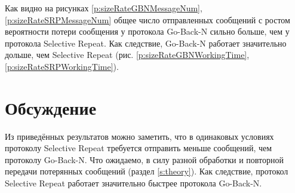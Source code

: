 \documentclass[a4paper,12pt]{article}
\begin{document}
    Как видно на рисунках \ref{p:sizeRateGBNMessageNum}, \ref{p:sizeRateSRPMessageNum} общее число отправленных сообщений с ростом вероятности потери сообщения
    у протокола Go-Back-N сильно больше, чем у протокола Selective Repeat. Как следствие, Go-Back-N работает значительно дольше, чем Selective Repeat (рис. \ref{p:sizeRateGBNWorkingTime}, \ref{p:sizeRateSRPWorkingTime}). 

    \section{Обсуждение}
    \quad Из приведённых результатов можно заметить, что в одинаковых условиях протоколу Selective Repeat требуется отправить меньше сообщений, чем протоколу Go-Back-N.
    Что ожидаемо, в силу разной обработки и повторной передачи потерянных сообщений (раздел \ref{s:theory}).
    Как следствие, протокол Selective Repeat работает значительно быстрее протокола Go-Back-N.
\end{document}
